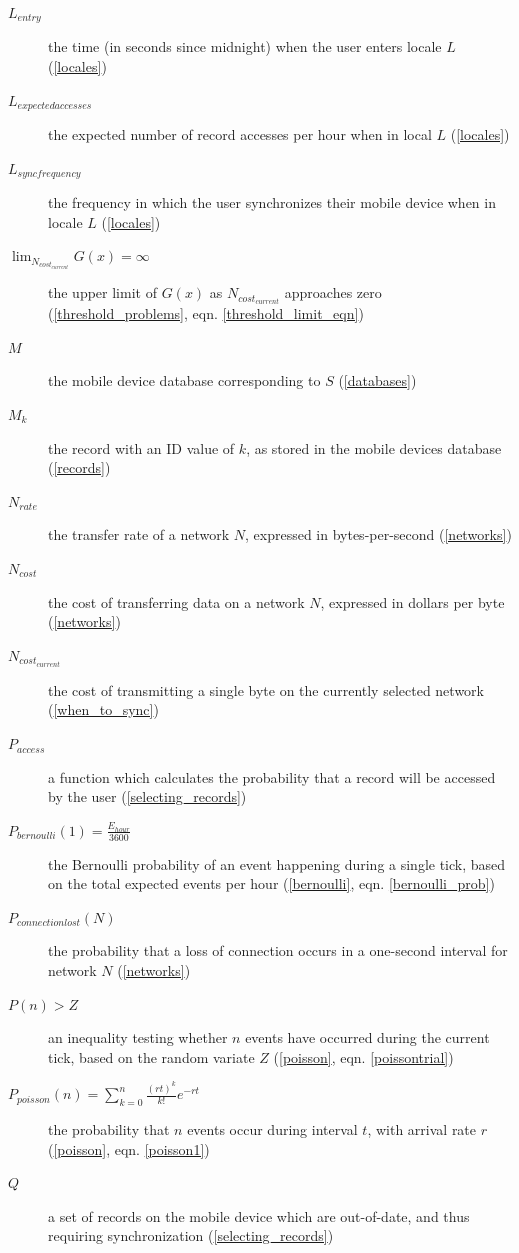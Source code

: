 \begin{description}
\item[$L_{entry}$] the time (in seconds since midnight) when the user enters locale $L$ (\ref{locales})
\item[$L_{expected accesses}$] the expected number of record accesses per hour when in local $L$ (\ref{locales})
\item[$L_{sync frequency}$] the frequency in which the user synchronizes their mobile device when in locale $L$ (\ref{locales})
\item[$\lim_{N_{cost_{current}}}G(x) = \infty$] the upper limit of $G(x)$ as $N_{cost_{current}}$ approaches zero (\ref{threshold_problems}, eqn. \ref{threshold_limit_eqn})
\item[$M$] the mobile device database corresponding to $S$ (\ref{databases})
\item[$M_k$] the record with an ID value of $k$, as stored in the mobile devices database (\ref{records})
\item[$N_{rate}$] the transfer rate of a network $N$, expressed in bytes-per-second (\ref{networks})
\item[$N_{cost}$] the cost of transferring data on a network $N$, expressed in dollars per byte (\ref{networks})
\item[$N_{cost_{current}}$] the cost of transmitting a single byte on the currently selected network (\ref{when_to_sync})
\item[$P_{access}$] a function which calculates the probability that a record will be accessed by the user (\ref{selecting_records})
\item[$P_{bernoulli}(1)=\frac{E_{hour}}{3600}$] the Bernoulli probability of an event happening during a single tick, based on the total expected events per hour (\ref{bernoulli}, eqn. \ref{bernoulli_prob})
\item[$P_{connection lost}(N)$] the probability that a loss of connection occurs in a one-second interval for network $N$ (\ref{networks})
\item[$P(n)>Z$] an inequality testing whether $n$ events have occurred during the current tick, based on the random variate $Z$ (\ref{poisson}, eqn. \ref{poissontrial})
\item[$P_{poisson}(n) = \sum_{k=0}^n \frac{(rt)^k}{k!}e^{-rt}$] the probability that $n$ events occur during interval $t$, with arrival rate $r$ (\ref{poisson}, eqn. \ref{poisson1})
\item[$Q$] a set of records on the mobile device which are out-of-date, and thus requiring synchronization (\ref{selecting_records})

\end{description}
